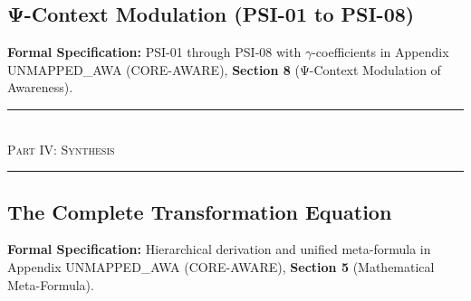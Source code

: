 \subsection{Ψ-Context Modulation (PSI-01 to PSI-08)}
\label{subsec:11-17-psi-modulation}



\begin{cross-reference}
\textbf{Formal Specification:} PSI-01 through PSI-08 with $\gamma$-coefficients in
Appendix UNMAPPED_AWA (CORE-AWARE), \textbf{Section 8} (Ψ-Context Modulation of Awareness).
\end{cross-reference}



\begin{center}
\rule{0.8\textwidth}{0.4pt}\\[0.5em]
{\large\textsc{Part IV: Synthesis}}\\[0.3em]
\rule{0.8\textwidth}{0.4pt}
\end{center}

\subsection{The Complete Transformation Equation}
\label{subsec:11-18-transformation}



\begin{cross-reference}
\textbf{Formal Specification:} Hierarchical derivation and unified meta-formula in
Appendix UNMAPPED_AWA (CORE-AWARE), \textbf{Section 5} (Mathematical Meta-Formula).
\end{cross-reference}


